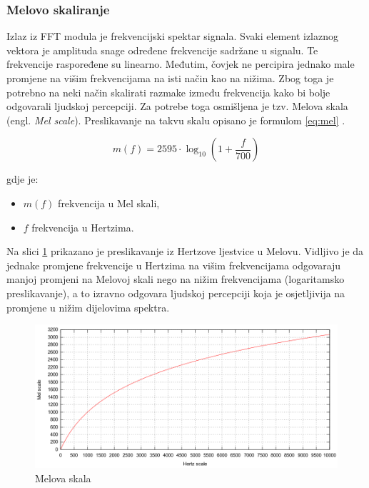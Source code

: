 \subsubsection{Melovo skaliranje}
\label{sec:mel}
Izlaz iz FFT modula je frekvencijski spektar signala.
Svaki element izlaznog vektora je amplituda snage određene frekvencije sadržane u signalu.
Te frekvencije raspoređene su linearno. Međutim, čovjek ne percipira jednako male promjene 
na višim frekvencijama na isti način kao na nižima. Zbog toga je potrebno na neki način skalirati
razmake između frekvencija kako bi bolje odgovarali ljudskoj percepciji. Za potrebe toga
osmišljena je tzv. Melova skala (engl. \textit{Mel scale}). Preslikavanje na takvu skalu opisano je formulom
\eqref{eq:mel} .

\begin{equation}
    m(f) = 2595 \cdot \log_{10}\left(1 + \frac{f}{700}\right)
    \label{eq:mel}
\end{equation}

gdje je:
\begin{itemize}
    \item \(m(f)\) frekvencija u Mel skali,
    \item \(f\) frekvencija u Hertzima.
\end{itemize}

Na slici \ref{pic:mel} prikazano je preslikavanje iz Hertzove ljestvice u Melovu. Vidljivo je da
jednake promjene frekvencije u Hertzima na višim frekvencijama odgovaraju manjoj promjeni 
na Melovoj skali nego na nižim frekvencijama (logaritamsko preslikavanje), a to izravno
odgovara ljudskoj percepciji koja je osjetljivija na promjene u nižim dijelovima spektra.

\begin{figure}[htb]
    \centering
    \includegraphics[width=0.8\linewidth]{Chapters/struktura_sustava/generiranje_znacajki/mel.png} 
    \caption{Melova skala \cite{mel}}
    \label{pic:mel}
\end{figure}


